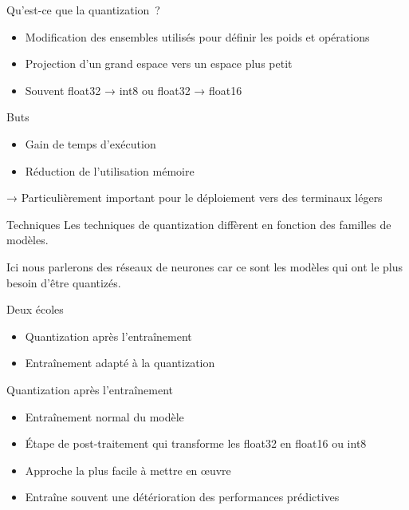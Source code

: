 \begin{frame}{Qu'est-ce que la quantization~?}
  \begin{itemize}
    \item Modification des ensembles utilisés pour définir les poids et opérations
    \item Projection d'un grand espace vers un espace plus petit
    \item Souvent float32 → int8 ou float32 → float16
  \end{itemize}
\end{frame}

\begin{frame}{Buts}
  \begin{itemize}
    \item Gain de temps d'exécution
    \item Réduction de l'utilisation mémoire
  \end{itemize}

  → Particulièrement important pour le déploiement vers des terminaux légers
\end{frame}

\begin{frame}{Techniques}
  Les techniques de quantization diffèrent en fonction des familles de modèles.

  Ici nous parlerons des réseaux de neurones car ce sont les modèles qui ont le plus besoin d'être quantizés.
\end{frame}

\begin{frame}{Deux écoles}
  \begin{itemize}
    \item Quantization après l'entraînement
    \item Entraînement adapté à la quantization
  \end{itemize}
\end{frame}

\begin{frame}{Quantization après l'entraînement}
  \begin{itemize}
    \item Entraînement normal du modèle
    \item Étape de post-traitement qui transforme les float32 en float16 ou int8
    \item Approche la plus facile à mettre en œuvre
    \item Entraîne souvent une détérioration des performances prédictives
  \end{itemize}
\end{frame}

